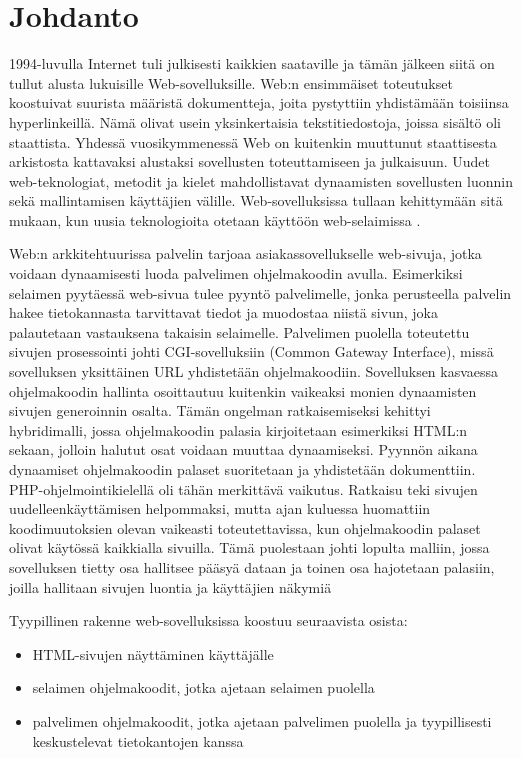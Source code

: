 \documentclass[utf8]{gradu3}
\begin{document}
\mainmatter

\chapter{Johdanto}

1994-luvulla Internet tuli julkisesti kaikkien saataville ja tämän jälkeen siitä on tullut alusta lukuisille Web-sovelluksille. Web:n ensimmäiset toteutukset koostuivat suurista määristä dokumentteja, joita pystyttiin
yhdistämään toisiinsa hyperlinkeillä. Nämä olivat usein yksinkertaisia tekstitiedostoja, joissa sisältö oli staattista. Yhdessä vuosikymmenessä Web on kuitenkin muuttunut staattisesta arkistosta kattavaksi alustaksi sovellusten toteuttamiseen ja julkaisuun. Uudet web-teknologiat, metodit ja kielet mahdollistavat dynaamisten sovellusten luonnin sekä mallintamisen käyttäjien välille. Web-sovelluksissa tullaan kehittymään sitä mukaan, kun uusia teknologioita otetaan käyttöön web-selaimissa \parencite{trends}. 

Web:n arkkitehtuurissa palvelin tarjoaa asiakassovellukselle web-sivuja, jotka voidaan dynaamisesti luoda palvelimen ohjelmakoodin avulla. Esimerkiksi selaimen pyytäessä web-sivua tulee pyyntö palvelimelle, jonka perusteella palvelin hakee tietokannasta tarvittavat tiedot ja muodostaa niistä sivun, joka palautetaan vastauksena takaisin selaimelle. Palvelimen puolella toteutettu sivujen prosessointi johti CGI-sovelluksiin (Common Gateway Interface), missä sovelluksen yksittäinen URL yhdistetään ohjelmakoodiin. Sovelluksen kasvaessa ohjelmakoodin hallinta osoittautuu kuitenkin vaikeaksi monien dynaamisten sivujen generoinnin osalta. Tämän ongelman ratkaisemiseksi kehittyi hybridimalli, jossa ohjelmakoodin palasia kirjoitetaan esimerkiksi HTML:n sekaan, jolloin halutut osat voidaan muuttaa dynaamiseksi. Pyynnön aikana dynaamiset ohjelmakoodin palaset suoritetaan ja yhdistetään dokumenttiin. PHP-ohjelmointikielellä oli tähän merkittävä vaikutus. Ratkaisu teki sivujen uudelleenkäyttämisen helpommaksi, mutta ajan kuluessa huomattiin koodimuutoksien olevan vaikeasti toteutettavissa, kun ohjelmakoodin palaset olivat käytössä kaikkialla sivuilla. Tämä puolestaan johti lopulta malliin, jossa sovelluksen tietty osa hallitsee pääsyä dataan ja toinen osa hajotetaan palasiin, joilla hallitaan sivujen luontia ja käyttäjien näkymiä \parencite[3.1]{trends}

Tyypillinen rakenne web-sovelluksissa koostuu seuraavista osista: 
\begin{itemize}
\item HTML-sivujen näyttäminen käyttäjälle
\item selaimen ohjelmakoodit, jotka ajetaan selaimen puolella
\item palvelimen ohjelmakoodit, jotka ajetaan palvelimen puolella ja tyypillisesti keskustelevat tietokantojen kanssa
\end{itemize}
\end{document}
